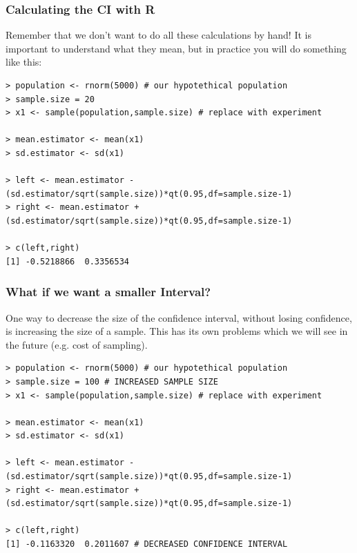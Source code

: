\documentclass[10pt]{beamer}
\begin{document}
\begin{frame}
  \frametitle{Calculating the CI with R} 

  Remember that we don't want to do all these calculations by hand! It
  is important to understand what they mean, but in practice you will
  do something like this:
  
{\small
\begin{verbatim}
> population <- rnorm(5000) # our hypotethical population
> sample.size = 20
> x1 <- sample(population,sample.size) # replace with experiment

> mean.estimator <- mean(x1)
> sd.estimator <- sd(x1)

> left <- mean.estimator - (sd.estimator/sqrt(sample.size))*qt(0.95,df=sample.size-1)
> right <- mean.estimator + (sd.estimator/sqrt(sample.size))*qt(0.95,df=sample.size-1)

> c(left,right)
[1] -0.5218866  0.3356534
\end{verbatim}}
\end{frame}

\begin{frame}
  \frametitle{What if we want a smaller Interval?} 

  One way to decrease the size of the confidence interval, without
  losing confidence, is increasing the size of a sample. This has its
  own problems which we will see in the future (e.g. cost of
  sampling).
  
{\small
\begin{verbatim}
> population <- rnorm(5000) # our hypotethical population
> sample.size = 100 # INCREASED SAMPLE SIZE
> x1 <- sample(population,sample.size) # replace with experiment

> mean.estimator <- mean(x1)
> sd.estimator <- sd(x1)

> left <- mean.estimator - (sd.estimator/sqrt(sample.size))*qt(0.95,df=sample.size-1)
> right <- mean.estimator + (sd.estimator/sqrt(sample.size))*qt(0.95,df=sample.size-1)

> c(left,right)
[1] -0.1163320  0.2011607 # DECREASED CONFIDENCE INTERVAL
\end{verbatim}}
\end{frame}
\end{document}
